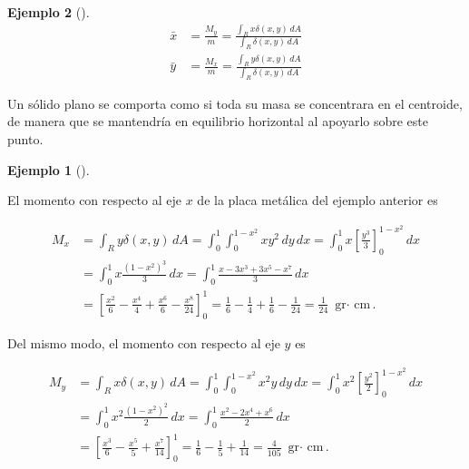 \documentclass[
  a4paper,
]{scrreport}
\theoremstyle{definition}
\newtheorem{example}{Ejemplo}[chapter]
\theoremstyle{plain}
\theoremstyle{definition}
\theoremstyle{definition}
\theoremstyle{plain}
\theoremstyle{plain}
\theoremstyle{remark}
\begin{document}
\begin{example}[]
\begin{align*}
\bar x 
&= \frac{M_y}{m}
= \frac{\int_R x\delta(x,y)\,dA}{\int_R \delta(x,y)\,dA} \\
\bar y
&= \frac{M_x}{m}
= \frac{\int_R y\delta(x,y)\,dA}{\int_R \delta(x,y)\,dA}
\end{align*}

\begin{tcolorbox}[enhanced jigsaw, leftrule=.75mm, colbacktitle=quarto-callout-note-color!10!white, toprule=.15mm, opacityback=0, opacitybacktitle=0.6, toptitle=1mm, breakable, bottomtitle=1mm, colframe=quarto-callout-note-color-frame, rightrule=.15mm, titlerule=0mm, title=\textcolor{quarto-callout-note-color}{\faInfo}\hspace{0.5em}{Nota}, arc=.35mm, left=2mm, bottomrule=.15mm, colback=white, coltitle=black]

Un sólido plano se comporta como si toda su masa se concentrara en el
centroide, de manera que se mantendría en equilibrio horizontal al
apoyarlo sobre este punto.

\end{tcolorbox}

\begin{example}[]\protect\hypertarget{exm-centro-masas-solido-plano-densidad-variable}{}\label{exm-centro-masas-solido-plano-densidad-variable}

El momento con respecto al eje \(x\) de la placa metálica del ejemplo
anterior es

\begin{align*}
M_x
&= \int_R y\delta(x,y)\,dA
= \int_0^1 \int_0^{1-x^2} xy^2\,dy\,dx
= \int_0^1 x\left[\frac{y^3}{3}\right]_0^{1-x^2}\,dx \\
&= \int_0^1 x\frac{(1-x^2)^3}{3}\,dx 
= \int_0^1 \frac{x-3x^3+3x^5-x^7}{3}\,dx \\
&= \left[\frac{x^2}{6}-\frac{x^4}{4}+\frac{x^6}{6}-\frac{x^8}{24}\right]_0^1
= \frac{1}{6}-\frac{1}{4}+\frac{1}{6}-\frac{1}{24}
= \frac{1}{24} \mbox{ gr$\cdot$ cm}.
\end{align*}

Del mismo modo, el momento con respecto al eje \(y\) es

\begin{align*}
M_y
&= \int_R x\delta(x,y)\,dA
= \int_0^1 \int_0^{1-x^2} x^2y\,dy\,dx
= \int_0^1 x^2\left[\frac{y^2}{2}\right]_0^{1-x^2}\,dx \\
&= \int_0^1 x^2\frac{(1-x^2)^2}{2}\,dx 
= \int_0^1 \frac{x^2-2x^4+x^6}{2}\,dx \\
&= \left[\frac{x^3}{6}-\frac{x^5}{5}+\frac{x^7}{14}\right]_0^1
= \frac{1}{6}-\frac{1}{5}+\frac{1}{14}
= \frac{4}{105} \mbox{ gr$\cdot$ cm}.
\end{align*}


\end{example}
\end{example}
\end{document}
